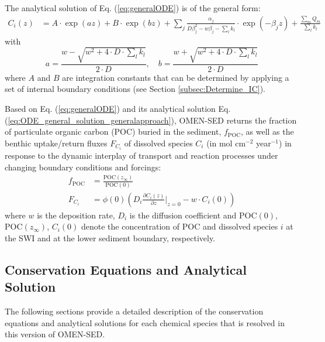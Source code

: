 \documentclass[gmd, manuscript]{copernicus}
\begin{document}
The analytical solution of Eq. (\ref{eq:generalODE}) is of the general form:
\begin{align}
 C_i(z) &= A \cdot \exp(az) + B \cdot \exp(bz) + \sum_j \frac{\alpha_j}{D \beta_j^2-w\beta_j- \sum_l k_l}\cdot \exp(-\beta_j z) + \frac{\sum_m Q_m}{\sum_l k_l} \label{eq:ODE_general_solution_generalapproach}
\end{align}
with 
\begin{equation} 
 a = \frac{w - \sqrt{w^2+4\cdot D\cdot \sum_l k_l}}{2\cdot D}, \quad b = \frac{w + \sqrt{w^2+4\cdot D\cdot \sum_l k_l}}{2\cdot D}
\end{equation}
where $A$ and $B$ are integration constants that can be determined by applying a set of internal boundary conditions (see Section \ref{subsec:Determine_IC}).

Based on Eq. (\ref{eq:generalODE}) and its analytical solution Eq. (\ref{eq:ODE_general_solution_generalapproach}), OMEN-SED returns the fraction of particulate organic carbon (POC) buried in the sediment, 
$f_{\mathrm{POC}}$, as well as the benthic uptake/return fluxes $F_{C_i}$ of dissolved species $C_i$ (in mol cm$^{-2}$ year$^{-1}$) in response to the dynamic interplay of transport and reaction processes under changing boundary conditions and forcings:
\begin{align}
f_{\mathrm{POC}} &= \frac{\mathrm{POC}(z_\infty)}{\mathrm{POC}(0)} \label{f_POC_pres}\\
F_{C_i} &= \phi(0) \left(D_i \frac{\partial C_i(z)}{\partial z}\bigg\rvert_{z=0} - w \cdot C_i(0) \right) \label{Eq:F_Ci_SWIflux}
\end{align}
where $w$ is the deposition rate, $D_i$ is the diffusion coefficient and $\mathrm{POC}(0)$, $\mathrm{POC}(z_\infty)$, $C_i(0)$ denote the concentration of POC and dissolved species $i$ at the SWI and 
at the lower sediment boundary, respectively.


\subsection{Conservation Equations and Analytical Solution}\label{subsec:ReactionNetwork}
The following sections provide a detailed description of the conservation equations and analytical solutions for each chemical species that is resolved in this version of OMEN-SED.
\end{document}
